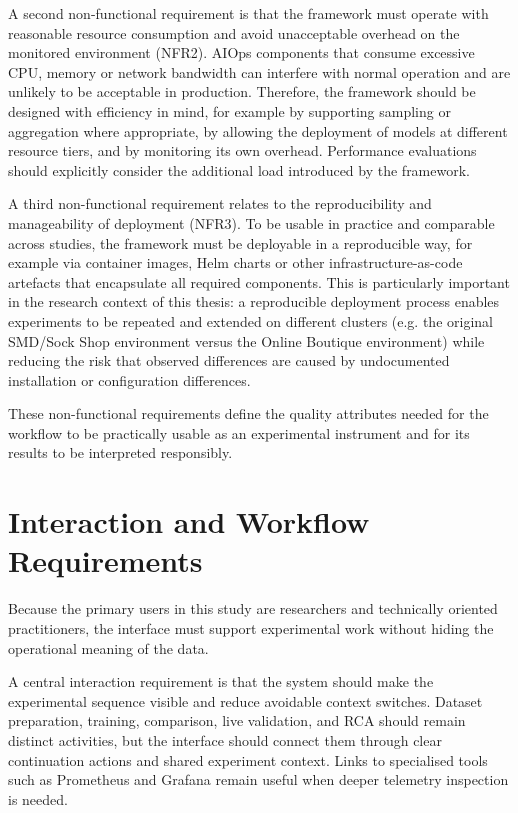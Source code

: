 A second non-functional requirement is that the framework must operate with reasonable resource consumption and avoid unacceptable overhead on the monitored environment (NFR2). AIOps components that consume excessive CPU, memory or network bandwidth can interfere with normal operation and are unlikely to be acceptable in production. Therefore, the framework should be designed with efficiency in mind, for example by supporting sampling or aggregation where appropriate, by allowing the deployment of models at different resource tiers, and by monitoring its own overhead. Performance evaluations should explicitly consider the additional load introduced by the framework.

A third non-functional requirement relates to the reproducibility and manageability of deployment (NFR3). To be usable in practice and comparable across studies, the framework must be deployable in a reproducible way, for example via container images, Helm charts or other infrastructure-as-code artefacts that encapsulate all required components. This is particularly important in the research context of this thesis: a reproducible deployment process enables experiments to be repeated and extended on different clusters (e.g. the original SMD/Sock Shop environment versus the Online Boutique environment) while reducing the risk that observed differences are caused by undocumented installation or configuration differences.

These non-functional requirements define the quality attributes needed for the workflow to be practically usable as an experimental instrument and for its results to be interpreted responsibly.

\section{Interaction and Workflow Requirements}
Because the primary users in this study are researchers and technically oriented practitioners, the interface must support experimental work without hiding the operational meaning of the data.

A central interaction requirement is that the system should make the experimental sequence visible and reduce avoidable context switches. Dataset preparation, training, comparison, live validation, and RCA should remain distinct activities, but the interface should connect them through clear continuation actions and shared experiment context. Links to specialised tools such as Prometheus and Grafana remain useful when deeper telemetry inspection is needed.

